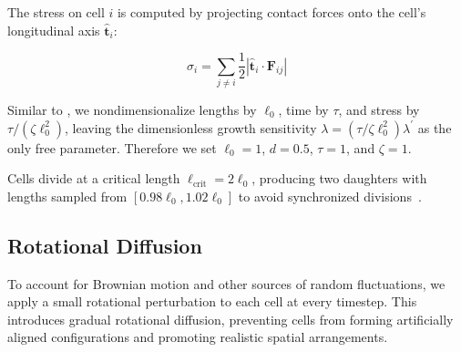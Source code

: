 \documentclass[conference]{IEEEtran}
\begin{document}
The stress on cell $i$ is computed by projecting contact forces onto the cell's longitudinal axis $\hat{\mathbf{t}}_i$:

\begin{equation} \label{eq:stress}
    \sigma_i = \sum_{j \neq i} \frac{1}{2} \left| \hat{\mathbf{t}}_i \cdot \mathbf{F}_{ij} \right|
\end{equation}

Similar to \cite{Weady2024SM}, we nondimensionalize lengths by $\ell_0$, time by $\tau$, and stress by $\tau / (\zeta \ell_0^2)$, leaving the dimensionless growth sensitivity $\lambda = (\tau / \zeta \ell_0^2)\lambda^{'}$ as the only free parameter. Therefore we set $\ell_0 = 1$, $d = 0.5$, $\tau = 1$, and $\zeta = 1$.

Cells divide at a critical length $\ell_{\text{crit}} = 2 \ell_0$, producing two daughters with lengths sampled from $\left[0.98 \ell_0, 1.02 \ell_0 \right]$ to avoid synchronized divisions~\cite{You2018}.

\subsection{Rotational Diffusion}

To account for Brownian motion and other sources of random fluctuations, we apply a small rotational perturbation to each cell at every timestep. This introduces gradual rotational diffusion, preventing cells from forming artificially aligned configurations and promoting realistic spatial arrangements.
\end{document}
